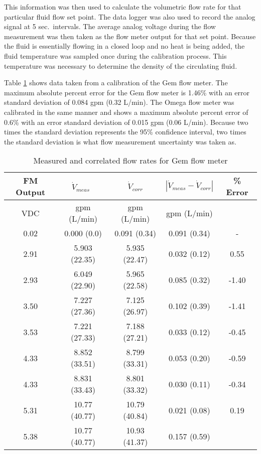 This information was then used to calculate the volumetric flow rate for that particular fluid flow set point. The data logger was also used to record the analog signal at 5 sec.\ intervals. The average analog voltage during the flow measurement was then taken as the flow meter output for that set point. Because the fluid is essentially flowing in a closed loop and no heat is being added, the fluid temperature was sampled once during the calibration process. This temperature was necessary to determine the density of the circulating fluid.

Table \ref{tab:ExpMethod:Instr:FlowCal:CalDataCompare} shows data taken from a calibration of the Gem flow meter. The maximum absolute percent error for the Gem flow meter is 1.46\% with an error standard deviation of 0.084 gpm (0.32 L/min). The Omega flow meter was calibrated in the same manner and shows a maximum absolute percent error of 0.6\% with an error standard deviation of 0.015 gpm (0.06 L/min). Because two times the standard deviation represents the 95\% confidence interval, two times the standard deviation is what flow measurement uncertainty was taken as.

\begin{table}[h]
	\centering
	\caption{Measured and correlated flow rates for Gem flow meter}
	\label{tab:ExpMethod:Instr:FlowCal:CalDataCompare}
	\begin{tabular}{c | c | c | c | c}
	\hline
	FM Output & $\dot{V}_{meas}$\ & $\dot{V}_{corr}$ & $|\dot{V}_{meas} - \dot{V}_{corr}|$ & \% Error\\
	\hline
	VDC & gpm (L/min) & gpm (L/min) & gpm (L/min)\\
	\hline\hline
	0.02 & 0.000 (0.0) & 0.091 (0.34) & 0.091 (0.34) & - \\
	\hline
	2.91 & 5.903 (22.35) & 5.935 (22.47) & 0.032 (0.12) & 0.55\\
	\hline
	2.93 & 6.049 (22.90) & 5.965 (22.58) & 0.085 (0.32) & -1.40 \\
	\hline
	3.50 & 7.227 (27.36) & 7.125 (26.97) & 0.102 (0.39) & -1.41 \\
	\hline
	3.53 & 7.221 (27.33) & 7.188 (27.21) & 0.033 (0.12) & -0.45\\
	\hline
	4.33 & 8.852 (33.51) & 8.799 (33.31) & 0.053 (0.20) & -0.59\\
	\hline
	4.33 & 8.831 (33.43) & 8.801 (33.32) & 0.030 (0.11) & -0.34\\
	\hline
	5.31 & 10.77 (40.77) & 10.79 (40.84) & 0.021 (0.08) & 0.19\\
	\hline
	5.38 & 10.77 (40.77) & 10.93 (41.37) & 0.157 (0.59) & \color{red}{1.46} \\
	\hline
	\end{tabular}
\end{table}

